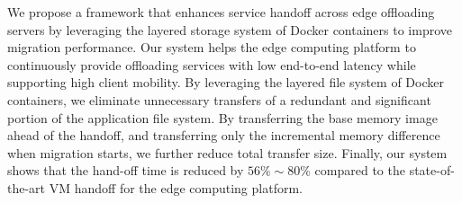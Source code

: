 We propose a framework that enhances service handoff across edge offloading servers by leveraging the layered storage system of Docker containers to improve migration performance.
Our system helps the edge computing platform to continuously provide offloading services with low end-to-end latency while supporting high client mobility. 
By leveraging the layered file system of Docker containers, we eliminate unnecessary transfers of a redundant and significant portion of the application file system. 
By transferring the base memory image ahead of the handoff, and transferring only the incremental memory difference when migration starts, we further reduce total transfer size. Finally, our system shows that the hand-off time is reduced by $56\%\sim 80\%$ compared to the state-of-the-art VM handoff for the edge computing platform.


